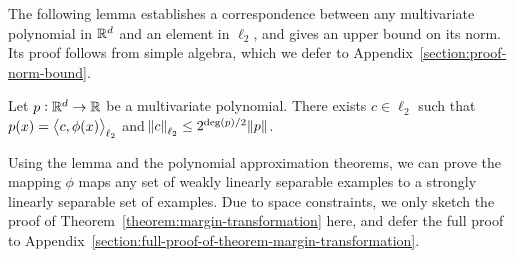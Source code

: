 The following lemma establishes a correspondence
between any multivariate polynomial in $\mathbb{R}^d$
and an element in $\ell_2$, and gives an upper bound on its norm.
Its proof follows from simple algebra, which we defer to
Appendix~\ref{section:proof-norm-bound}.

\begin{lemma}
\label{lemma:norm-bound}
Let $p:\mathbb{R}^d \to \mathbb{R}$ be a multivariate polynomial.
There exists $c \in \ell_2$ such that $p(x) = \left\langle c, \phi(x) \right\rangle_{\ell_2}$
and $\norm{c}_{\ell_2} \le 2^{\deg(p)/2} \norm{p}$.
\end{lemma}

Using the lemma and the polynomial approximation theorems, we can prove the
mapping $\phi$ maps any set of weakly linearly separable examples
to a strongly linearly separable set of examples. Due to space constraints,
we only sketch the
proof of Theorem~\ref{theorem:margin-transformation} here, and defer the full
proof to Appendix~\ref{section:full-proof-of-theorem-margin-transformation}.

